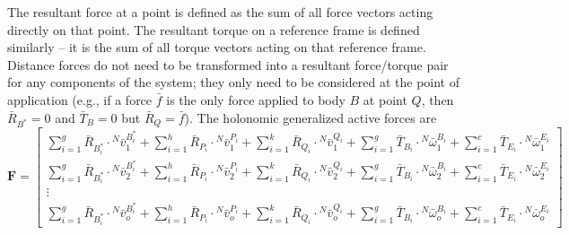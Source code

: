 \documentclass[smallcondensed,final]{svjour3}                     %
\begin{document}
The resultant force at a point is defined as the sum of all force vectors
acting directly on that point. The resultant torque on a reference frame is
defined similarly -- it is the sum of all torque vectors acting on that
reference frame. Distance forces do not need to be transformed into a resultant
force/torque pair for any components of the system; they only need to be
considered at the point of application (e.g., if a force $\bar{f}$ is the only
force applied to body $B$ at point $Q$, then $\bar{R}_{B^*}=0$ and
$\bar{T}_B=0$ but $\bar{R}_Q=\bar{f}$). The holonomic generalized active forces are
\begin{equation}
\label{eq:definition_F}
\mathbf{F} =
\begin{bmatrix}
\displaystyle \sum_{i=1}^g \bar{R}_{B^*_i} \cdot {^N}\bar{v}^{B^*_i}_1 +
\sum_{i=1}^h \bar{R}_{P_i} \cdot {^N}\bar{v}^{P_i}_1 +
\sum_{i=1}^k \bar{R}_{Q_i} \cdot {^N}\bar{v}^{Q_i}_1 +
\sum_{i=1}^g \bar{T}_{B_i} \cdot {^N}\bar{\omega}^{B_i}_1 +
\sum_{i=1}^c \bar{T}_{E_i} \cdot {^N}\bar{\omega}^{E_i}_1 \\
\displaystyle \sum_{i=1}^g \bar{R}_{B^*_i} \cdot {^N}\bar{v}^{B^*_i}_2 +
\sum_{i=1}^h \bar{R}_{P_i} \cdot {^N}\bar{v}^{P_i}_2 +
\sum_{i=1}^k \bar{R}_{Q_i} \cdot {^N}\bar{v}^{Q_i}_2 +
\sum_{i=1}^g \bar{T}_{B_i} \cdot {^N}\bar{\omega}^{B_i}_2 +
\sum_{i=1}^c \bar{T}_{E_i} \cdot {^N}\bar{\omega}^{E_i}_2 \\
\displaystyle \vdots \\
\displaystyle \sum_{i=1}^g \bar{R}_{B^*_i} \cdot {^N}\bar{v}^{B^*_i}_o +
\sum_{i=1}^h \bar{R}_{P_i} \cdot {^N}\bar{v}^{P_i}_o +
\sum_{i=1}^k \bar{R}_{Q_i} \cdot {^N}\bar{v}^{Q_i}_o +
\sum_{i=1}^g \bar{T}_{B_i} \cdot {^N}\bar{\omega}^{B_i}_o +
\sum_{i=1}^c \bar{T}_{E_i} \cdot {^N}\bar{\omega}^{E_i}_o
\end{bmatrix}
\end{equation}
\end{document}
